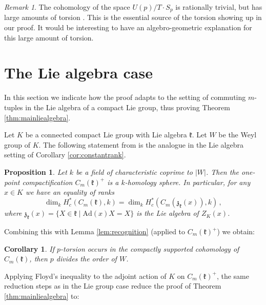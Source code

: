 \documentclass[oneside, 12pt, a4paper]{amsart}
\numberwithin{equation}{section}
\theoremstyle{plain}
\newtheorem{proposition}[theorem]{Proposition}
\newtheorem{corollary}[theorem]{Corollary}
\theoremstyle{definition}
\theoremstyle{remark}
\newtheorem{remark}[theorem]{Remark}
\begin{document}
\begin{remark}
The cohomology of the space $U(p)/T\cdot S_p$ is rationally trivial, but has large amounts of torsion \cite{GuerraJanna}. This is the essential source of the torsion showing up in our proof. It would be interesting to have an algebro-geometric explanation for this large amount of torsion.
\end{remark}


\section{The Lie algebra case}

In this section we indicate how the proof adapts to the setting of commuting $m$-tuples in the Lie algebra of a compact Lie group, thus proving Theorem \ref{thm:mainliealgebra}.

Let $K$ be a connected compact Lie group with Lie algebra $\mathfrak{k}$. Let $W$ be the Weyl group of $K$. The following statement from \cite[Theorem D]{AGG} is the analogue in the Lie algebra setting of Corollary \ref{cor:constantrank}.

\begin{proposition}
    Let $k$ be a field of characteristic coprime to $|W|$. Then the one-point compactification $C_m(\mathfrak{k})^+$ is a $k$-homology sphere. In particular, for any $x\in K$ we have an equality of ranks
    \[
    \dim_k H^\ast_c(C_m(\mathfrak{k}),k) = \dim_k H^\ast_c(C_m(\mathfrak{z}_{\mathfrak{k}}(x)),k)\, ,
    \]
    where $\mathfrak{z}_\mathfrak{k}(x)=\{X\in \mathfrak{k}\mid \mathrm{Ad}(x)X=X\}$ is the Lie algebra of $Z_K(x)$.
\end{proposition}

Combining this with Lemma \ref{lem:recognition} (applied to $C_m(\mathfrak{k})^+$) we obtain:

\begin{corollary}
    If $p$-torsion occurs in the compactly supported cohomology of $C_m(\mathfrak{k})$, then $p$ divides the order of $W$.
\end{corollary}

Applying Floyd's inequality to the adjoint action of $K$ on $C_m(\mathfrak{k})^+$, the same reduction steps as in the Lie group case reduce the proof of Theorem \ref{thm:mainliealgebra} to:
\end{document}
